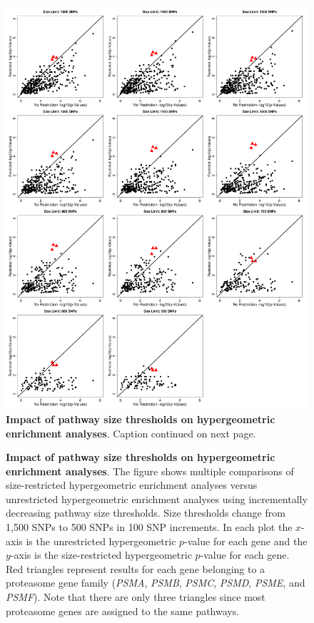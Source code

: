 \documentclass[10pt,a4paper]{article}
\begin{document}
\setlength{\footskip}{2cm}
\begin{figure}[htbp]
\centering
\vspace*{-1.75cm}
\hspace*{-1cm}
\includegraphics[scale=.325]{Images/Supp/InterPath_Supp_Figure_Hypergemeotric_SizeThresholds_vs1.png}
\caption[TBD]{\textbf{Impact of pathway size thresholds on hypergeometric enrichment analyses}. Caption continued on next page.}
\label{InterPath-Supp-Figure-Hypergeoemtric-SizeThresholds}
\end{figure}
\clearpage
\setlength{\footskip}{1cm}

\addtocounter{figure}{-1}
\begin{figure} [t!]
  \caption{\textbf{Impact of pathway size thresholds on hypergeometric enrichment analyses}. The figure shows multiple comparisons of size-restricted hypergeometric enrichment analyses versus unrestricted hypergeometric enrichment analyses using incrementally decreasing pathway size thresholds. Size thresholds change from 1,500 SNPs to 500 SNPs in 100 SNP increments. In each plot the $x$-axis is the unrestricted hypergeometric $p$-value for each gene and the $y$-axis is the size-restricted hypergeometric $p$-value for each gene. Red triangles represent results for each gene belonging to a proteasome gene family ({\emph{PSMA}}, {\emph{PSMB}}, {\emph{PSMC}}, {\emph{PSMD}}, {\emph{PSME}}, and {\emph{PSMF}}). Note that there are only three triangles since most proteasome genes are assigned to the same pathways.}
\label{InterPath-Supp-Figure-Hypergeoemtric-SizeThresholds-Caption}
\end{figure}
\clearpage
\end{document}
